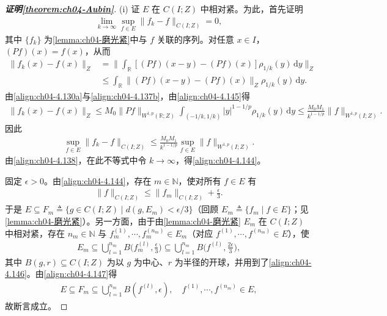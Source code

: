 \documentclass[../../main.tex]{subfiles}%
\begin{document}
\begin{proof}[\textbf{证明\cref{theorem:ch04-Aubin}}]
(i) 证 $E$ 在 $C(I;Z)$ 中相对紧。为此，首先证明
\begin{align}
\lim_{k\to\infty}\sup_{f\in E}\|f_k-f\|_{C(I;Z)}=0, \label{align:ch04-4.144}
\end{align}
其中 $\{f_k\}$ 为\cref{lemma:ch04-磨光紧}中与 $f$ 关联的序列。对任意 $x\in I$，$(Pf)(x)=f(x)$，从而
\begin{align}
\|f_k(x)-f(x)\|_Z&=\Big\|\int_{\mathbb{R}}[(Pf)(x-y)-(Pf)(x)]\rho_{1/k}(y)\,\mathrm{d}y\Big\|_Z\nonumber\\
&\leqslant\int_{\mathbb{R}}\|(Pf)(x-y)-(Pf)(x)\|_Z\rho_{1/k}(y)\,\mathrm{d}y. \label{align:ch04-4.145}
\end{align}
由\eqref{align:ch04-4.130a}与\eqref{align:ch04-4.137b}，由\eqref{align:ch04-4.145}得
\begin{align*}
\|f_k(x)-f(x)\|_Z\leqslant M_0\|Pf\|_{W^{1,p}(\mathbb{R};Z)}\int_{(-1/k,1/k)}|y|^{1-1/p}\rho_{1/k}(y)\,\mathrm{d}y
\leqslant\frac{M_0M_1}{k^{1-1/p}}\|f\|_{W^{1,p}(I;Z)}.
\end{align*}
因此
\begin{align*}
\sup_{f\in E}\|f_k-f\|_{C(I;Z)}\leqslant\frac{M_0M_1}{k^{1-1/p}}\sup_{f\in E}\|f\|_{W^{1,p}(I;Z)}.
\end{align*}
由\eqref{align:ch04-4.138}，在此不等式中令 $k\to\infty$，得\eqref{align:ch04-4.144}。

固定 $\epsilon>0$。由\eqref{align:ch04-4.144}，存在 $m\in\mathbb{N}$，使对所有 $f\in E$ 有
\begin{align}
\|f\|_{C(I;Z)}\leqslant\|f_m\|_{C(I;Z)}+\frac{\epsilon}{3}. \label{align:ch04-4.146}
\end{align}
于是 $E\subseteq F_m\triangleq \{g\in C(I;Z)\mid d(g,E_m)<\epsilon/3\}$（回顾 $E_m\triangleq \{f_m\mid f\in E\}$；见\cref{lemma:ch04-磨光紧}）。另一方面，由于由\cref{lemma:ch04-磨光紧} $E_m$ 在 $C(I;Z)$ 中相对紧，存在 $n_m\in\mathbb{N}$ 与 $f_m^{(1)},\cdots ,f_m^{(n_m)}\in E_m$（对应 $f^{(1)},\cdots ,f^{(n_m)}\in E$），使
\begin{align}
E_m\subseteq\bigcup_{l=1}^{n_m}B\Big(f_m^{(l)},\frac{\epsilon}{3}\Big)\subseteq\bigcup_{l=1}^{n_m}B\Big(f^{(l)},\frac{2\epsilon}{3}\Big), \label{align:ch04-4.147}
\end{align}
其中 $B(g,r)\subseteq C(I;Z)$ 为以 $g$ 为中心、$r$ 为半径的开球，并用到了\eqref{align:ch04-4.146}。由\eqref{align:ch04-4.147}得
\begin{align*}
E\subseteq F_m\subseteq\bigcup_{l=1}^{n_m}B(f^{(l)},\epsilon),\quad f^{(1)},\cdots ,f^{(n_m)}\in E,
\end{align*}
故断言成立。


\end{proof}
\end{document}
